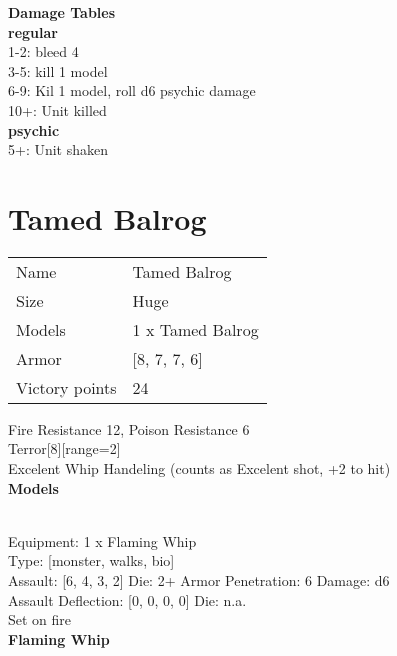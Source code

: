  





{\bf Damage Tables} \\
 {\bf regular } \\
1-2: bleed 4 \\
3-5: kill 1 model \\
6-9: Kil 1 model, roll d6 psychic damage \\
10+: Unit killed \\
 {\bf psychic } \\
5+: Unit shaken \\










\pagebreak\pagebreak

\section{ Tamed Balrog }

\begin{tabular}{ll}
  Name & Tamed Balrog \\
  Size & Huge\\
  Models & 1 x Tamed Balrog\\
  Armor & [8, 7, 7, 6]\\
  Victory points & 24\\
\end{tabular}

Fire Resistance 12, Poison Resistance 6\\ 
Terror[8][range=2]\\ 
Excelent Whip Handeling (counts as Excelent shot, +2 to hit)\\ 


{\bf Models}

 \\
Equipment: 1 x Flaming Whip \\
Type: [monster, walks, bio] \\

Assault: [6, 4, 3, 2] Die: 2+ Armor Penetration: 6 Damage: d6 \\
Assault Deflection: [0, 0, 0, 0] Die: n.a.\\
\indent Set on fire\\ 
 



{\bf Flaming Whip } \\



